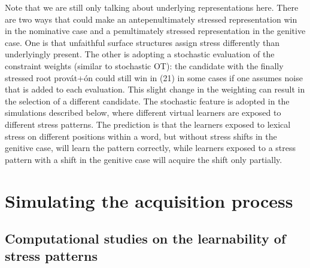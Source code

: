 \documentclass[a4paper]{article}
\begin{document}
Note that we are still only talking about underlying representations here. There are two ways that could make an antepenultimately stressed representation win in the nominative case and a penultimately stressed representation in the genitive case. One is that unfaithful surface structures assign stress differently than underlyingly present. The other is adopting a stochastic evaluation of the constraint weights (similar to stochastic OT): the candidate with the finally stressed root {\textbar}provát+ón{\textbar} could still win in (21) in some cases if one assumes noise that is added to each evaluation. This slight change in the weighting can result in the selection of a different candidate. The stochastic feature is adopted in the simulations described below, where different virtual learners are exposed to different stress patterns. The prediction is that the learners exposed to lexical stress on different positions within a word, but without stress shifts in the genitive case, will learn the pattern correctly, while learners exposed to a stress pattern with a shift in the genitive case will acquire the shift only partially.


\section{
Simulating the acquisition process}

\subsection{
Computational studies on the learnability of stress patterns}
\end{document}
